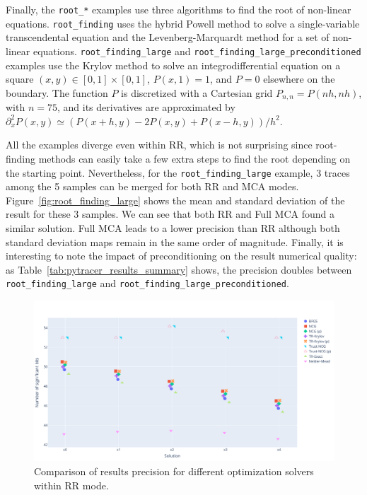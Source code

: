 \documentclass[11pt]{article}
\begin{document}
Finally, the \texttt{root\_*} examples use three algorithms to 
find the root of non-linear equations. \texttt{root\_finding}
uses the hybrid Powell method to solve a single-variable transcendental equation and 
the Levenberg-Marquardt method for a set of non-linear equations. 
\texttt{root\_finding\_large} and \texttt{root\_finding\_large\_preconditioned} examples use 
the Krylov method to solve an integrodifferential equation on a square
 $(x,y) \in [0,1] \times [0,1]$, $P(x,1)=1$, and $P=0$ elsewhere on the boundary.
The function $P$ is discretized with a Cartesian grid $P_{n,n}=P(nh,nh)$, with $n=75$, and its derivatives are approximated by $\partial_x^2P(x,y) \simeq (P(x+h,y) - 2P(x,y) + P(x-h,y))/h^2$.



All the examples diverge even within RR, which is not surprising since root-finding methods can easily take a few extra steps to find the root depending on the starting point. Nevertheless, for the \texttt{root\_finding\_large} example, 3 traces among the 5 samples can be merged for both RR and MCA modes.
Figure~\ref{fig:root_finding_large} shows the mean and standard deviation of the result for these 3 samples. We can see that both RR and Full MCA found a similar solution. Full MCA leads to a lower precision than RR although both standard deviation maps remain in the same order of magnitude. 
Finally, it is interesting to note the impact of preconditioning on the result numerical quality: as Table~\ref{tab:pytracer_results_summary} shows, the precision doubles between \texttt{root\_finding\_large} and \texttt{root\_finding\_large\_preconditioned}.

\begin{figure}
    \centering
    \includegraphics[width=\linewidth]{figure/unconstrained_optimization_comparison.pdf}
    \caption{Comparison of results precision for different optimization solvers within RR mode.}
    \label{fig:unconstrained_optimization}
\end{figure}
\end{document}
